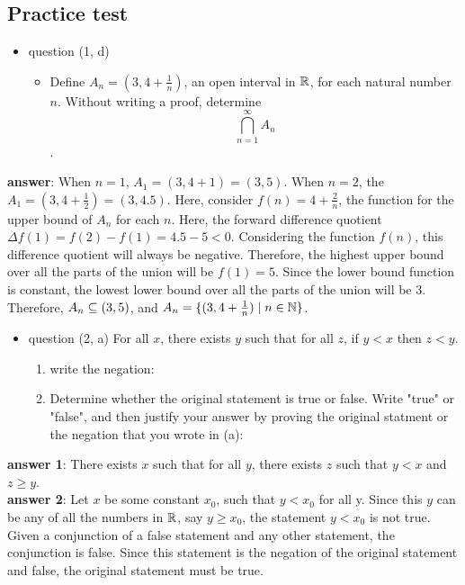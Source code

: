 \documentclass[12pt]{article}
\begin{document}
\subsection{Practice test}
\label{sec:orgb08de96}
\begin{itemize}
\item question (1, d)
\begin{itemize}
\item Define \(A_{n}=(3,4+\frac{1}{n})\), an open interval in \(\mathbb{R}\), for each natural
number \(n\). Without writing a proof, determine $$\bigcap\limits_{n=1}^{\infty}A_{n}$$.
\end{itemize}
\end{itemize}
\textbf{answer}: When \(n=1\), \(A_{1}=(3,4+1)=(3,5)\). When \(n=2\), the
\(A_{1}=(3,4+\frac{1}{2})=(3,4.5)\). Here, consider \(f(n)=4+\frac{2}{n}\), the
function for the upper bound of \(A_{n}\) for each \(n\). Here, the forward difference
quotient \(\Delta{}f(1)=f(2)-f(1)=4.5-5<0\). Considering the function \(f(n)\), this
difference quotient will always be negative. Therefore, the highest upper bound
over all the parts of the union will be \(f(1)=5\). Since the lower bound function
is constant, the lowest lower bound over all the parts of the union will be 3.
Therefore, \(A_{n}\subseteq{}(3,5)\), and \(A_{n}=\{(3,4+\frac{1}{n})\mid{}n\in{}\mathbb{N}\}\).

\begin{itemize}
\item question (2, a) For all \(x\), there exists \(y\) such that for all \(z\), if \(y<x\)
then \(z<y\).
\begin{enumerate}
\item write the negation:
\item Determine whether the original statement is true or false. Write "true" or
"false", and then justify your answer by proving the original statment or
the negation that you wrote in (a):
\end{enumerate}
\end{itemize}
\textbf{answer 1}: There exists \(x\) such that for all \(y\), there exists \(z\) such that
\(y<x\) and \(z\ge{}y\). \\
\textbf{answer 2}: Let \(x\) be some constant \(x_{0}\), such that \(y<x_{0}\) for all y. Since this
\(y\) can be any of all the numbers in \(\mathbb{R}\), say \(y\ge{}x_{0}\), the statement \(y<x_{0}\)
is not true. Given a conjunction of a false statement and any other statement,
the conjunction is false. Since this statement is the negation of the original
statement and false, the original statement must be true. \\
\end{document}
